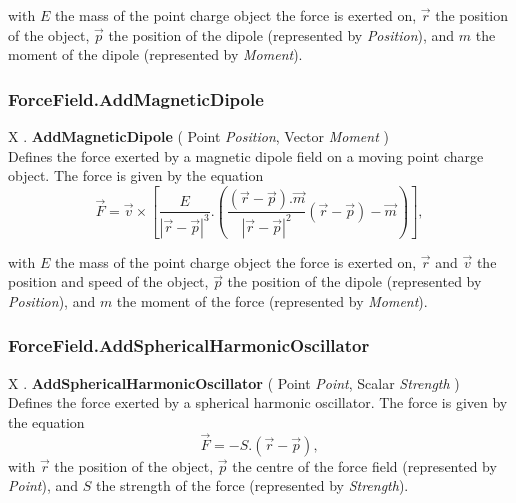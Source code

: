 \documentclass[10pt]{book}
\newcommand{\var}[1]{\textit{#1}}
\begin{document}
with $E$ the mass of the point charge object the force is exerted on, $\vec{r}$ the position of the object, $\vec{p}$ the position of the dipole (represented by \var{Position}), and $m$ the moment of the dipole (represented by \var{Moment}).


\subsubsection{ForceField.AddMagneticDipole \label{F:ForceField:AddMagneticDipole}}
X . \textbf{AddMagneticDipole} ( Point \textit{Position}, Vector \textit{Moment} ) \\
Defines the force exerted by a magnetic dipole field on a moving point charge object.
The force is given by the equation
\begin{equation}
\vec{F}=
\vec{v} \times
\left[
 \frac{E}{|\vec{r}-\vec{p}|^3} . 
\left(
 \frac{(\vec{r}-\vec{p}).\vec{m}}{|\vec{r}-\vec{p}|^2} (\vec{r}-\vec{p})
  - \vec{m} 
\right)
\right] ,
\end{equation}

with $E$ the mass of the point charge object the force is exerted on, $\vec{r}$ and $\vec{v}$ the position and speed of the object, $\vec{p}$ the position of the dipole (represented by \var{Position}), and $m$ the moment of the force (represented by \var{Moment}).


\subsubsection{ForceField.AddSphericalHarmonicOscillator \label{F:ForceField:AddSphericalHarmonicOscillator}}
X . \textbf{AddSphericalHarmonicOscillator} ( Point \textit{Point}, Scalar \textit{Strength} ) \\
Defines the force exerted by a spherical harmonic oscillator.
The force is given by the equation
\begin{equation}
\vec{F}= - S . (\vec{r}-\vec{p}),
\end{equation}
with $\vec{r}$ the position of the object, $\vec{p}$ the centre of the force field (represented by \var{Point}), and $S$ the strength of the force (represented by \var{Strength}).
\end{document}
